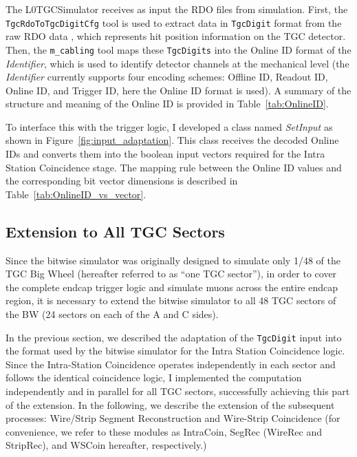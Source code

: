 The L0TGCSimulator receives as input the RDO files from simulation. First, the \\\texttt{TgcRdoToTgcDigitCfg} tool is used to extract data in \texttt{TgcDigit} format from the raw RDO data , which represents hit position information on the TGC detector. Then, the \texttt{m\_cabling} tool maps these \texttt{TgcDigits} into the Online ID format of the \textit{Identifier}, which is used to identify detector channels at the mechanical level (the \textit{Identifier} currently supports four encoding schemes: Offline ID, Readout ID, Online ID, and Trigger ID, here the Online ID format is used). A summary of the structure and meaning of the Online ID is provided in Table~\ref{tab:OnlineID}.


To interface this with the trigger logic, I developed a class named \textit{SetInput} as shown in Figure~\ref{fig:input_adaptation}. This class receives the decoded Online IDs and converts them into the boolean input vectors required for the Intra Station Coincidence stage. The mapping rule between the Online ID values and the corresponding bit vector dimensions is described in Table~\ref{tab:OnlineID_vs_vector}.


\subsection{Extension to All TGC Sectors} \label{subsec:Extension}
Since the bitwise simulator was originally designed to simulate only 1/48 of the TGC Big Wheel (hereafter referred to as “one TGC sector”), in order to cover the complete endcap trigger logic and simulate muons across the entire endcap region, it is necessary to extend the bitwise simulator to all 48 TGC sectors of the BW (24 sectors on each of the A and C sides).

In the previous section, we described the adaptation of the \texttt{TgcDigit} input into the format used by the bitwise simulator for the Intra Station Coincidence logic. Since the Intra-Station Coincidence operates independently in each sector and follows the identical coincidence logic, I implemented the computation independently and in parallel for all TGC sectors, successfully achieving this part of the extension. In the following, we describe the extension of the subsequent processes: Wire/Strip Segment Reconstruction and Wire-Strip Coincidence (for convenience, we refer to these modules as IntraCoin, SegRec (WireRec and StripRec), and WSCoin hereafter, respectively.)

